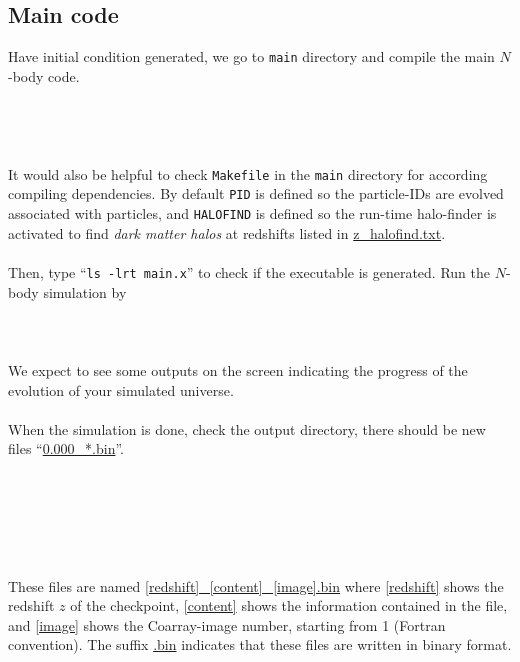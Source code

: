 \documentclass[12pt]{article}
\begin{document}
\subsection{Main code}
Have initial condition generated, we go to {\tt main} directory and compile the main $N$-body code.
\\\\
\\
\\
\\
It would also be helpful to check {\tt Makefile} in the {\tt main} directory for according compiling dependencies. By default {\tt PID} is defined so the particle-IDs are evolved associated with particles, and {\tt HALOFIND} is defined so the run-time halo-finder is activated to find {\it dark matter halos} at redshifts listed in \url{z_halofind.txt}.
\\\\
Then, type ``{\tt ls -lrt main.x}'' to check if the executable is generated. Run the $N$-body simulation by
\\\\
\\
\\
We expect to see some outputs on the screen indicating the progress of the evolution of your simulated universe.
\\\\
When the simulation is done, check the output directory, there should be new files ``\url{0.000_*.bin}''.
\\\\
\\
\\
\\
\\
\\
These files are named \url{[redshift]_[content]_[image].bin} where \url{[redshift]} shows the redshift $z$ of the checkpoint, \url{[content]} shows the information contained in the file, and \url{[image]} shows the Coarray-image number, starting from 1 (Fortran convention). The suffix \url{.bin} indicates that these files are written in binary format.
\\\\
\end{document}
